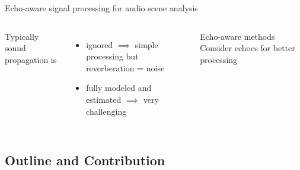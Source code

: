 \begin{frame}[t]{\alert{Echo-aware signal processing for audio scene analysis}}
    \begin{columns}
        Typically sound propagation is
        \begin{itemize}
            \item ignored $\implies$ simple processing but reverberation = noise
            \item fully modeled and estimated $\implies$ very challenging
        \end{itemize}

        \begin{mydefblock}{Echo-aware methods}
            Consider echoes for better processing
        \end{mydefblock}
    \end{columns}

\end{frame}

\subsection*{Outline and Contribution}

